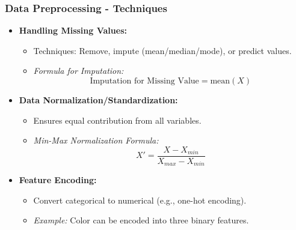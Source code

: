 \documentclass[aspectratio=169]{beamer}
\begin{document}
\begin{frame}[fragile]
    \frametitle{Data Preprocessing - Techniques}
    \begin{itemize}
        \item \textbf{Handling Missing Values:}
        \begin{itemize}
            \item Techniques: Remove, impute (mean/median/mode), or predict values.
            \item \textit{Formula for Imputation:}
            \begin{equation}
                \text{Imputation for Missing Value} = \text{mean}(X)
            \end{equation}
        \end{itemize}
        
        \item \textbf{Data Normalization/Standardization:}
        \begin{itemize}
            \item Ensures equal contribution from all variables.
            \item \textit{Min-Max Normalization Formula:}
            \begin{equation}
                X' = \frac{X - X_{min}}{X_{max} - X_{min}}
            \end{equation}
        \end{itemize}
        
        \item \textbf{Feature Encoding:}
        \begin{itemize}
            \item Convert categorical to numerical (e.g., one-hot encoding).
            \item \textit{Example:} Color can be encoded into three binary features.
        \end{itemize}
    \end{itemize}
\end{frame}
\end{document}
